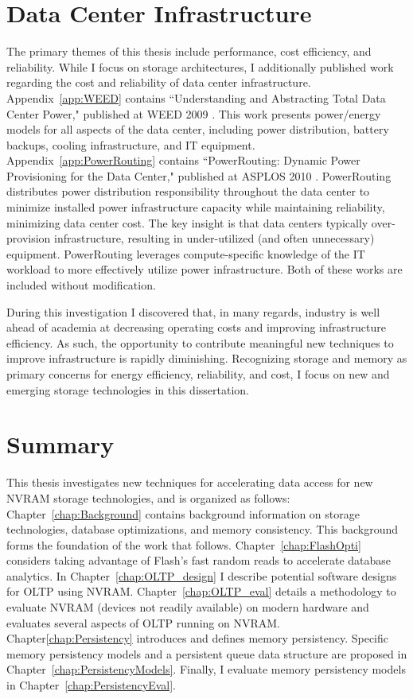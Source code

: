 \section{Data Center Infrastructure}
\label{sec:Intro:Additional}
The primary themes of this thesis include performance, cost efficiency, and reliability.
While I focus on storage architectures, I additionally published work regarding the cost and reliability of data center infrastructure.
Appendix~\ref{app:WEED} contains ``Understanding and Abstracting Total Data Center Power," published at WEED 2009 \cite{PelleyMeisner09}.
This work presents power/energy models for all aspects of the data center, including power distribution, battery backups, cooling infrastructure, and IT equipment.
Appendix~\ref{app:PowerRouting} contains ``PowerRouting: Dynamic Power Provisioning for the Data Center," published at ASPLOS 2010 \cite{PelleyMeisner10}.
PowerRouting distributes power distribution responsibility throughout the data center to minimize installed power infrastructure capacity while maintaining reliability, minimizing data center cost.
The key insight is that data centers typically over-provision infrastructure, resulting in under-utilized (and often unnecessary) equipment.
PowerRouting leverages compute-specific knowledge of the IT workload to more effectively utilize power infrastructure.
Both of these works are included without modification.

During this investigation I discovered that, in many regards, industry is well ahead of academia at decreasing operating costs and improving infrastructure efficiency.
As such, the opportunity to contribute meaningful new techniques to improve infrastructure is rapidly diminishing.
Recognizing storage and memory as primary concerns for energy efficiency, reliability, and cost, I focus on new and emerging storage technologies in this dissertation.

\section{Summary}
\label{sec:Intro:Summary}
This thesis investigates new techniques for accelerating data access for new NVRAM storage technologies, and is organized as follows:
Chapter~\ref{chap:Background} contains background information on storage technologies, database optimizations, and memory consistency.
This background forms the foundation of the work that follows.
Chapter~\ref{chap:FlashOpti} considers taking advantage of Flash's fast random reads to accelerate database analytics.
In Chapter~\ref{chap:OLTP_design} I describe potential software designs for OLTP using NVRAM.
Chapter~\ref{chap:OLTP_eval} details a methodology to evaluate NVRAM (devices not readily available) on modern hardware and evaluates several aspects of OLTP running on NVRAM.
Chapter\ref{chap:Persistency} introduces and defines memory persistency.
Specific memory persistency models and a persistent queue data structure are proposed in Chapter~\ref{chap:PersistencyModels}.
Finally, I evaluate memory persistency models in Chapter~\ref{chap:PersistencyEval}.
